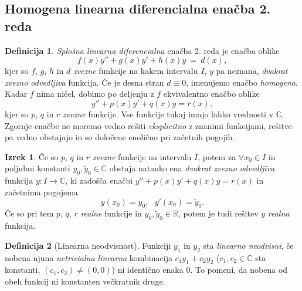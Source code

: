 \documentclass[11pt]{article}
\theoremstyle{definition}
\newtheorem{definicija}{Definicija}[section]
\theoremstyle{definition}
\theoremstyle{definition}
\newtheorem{izrek}{Izrek}[section]
\begin{document}

\subsection{Homogena linearna diferencialna enačba 2. reda}
\vspace{0.5cm}

\begin{definicija}

\textit{Splošna linearna diferencialna} enačba 2. reda je enačba oblike
$$f(x) y'' + g(x) y' + h(x) y ~=~ d(x),$$
kjer so $f$, $g$, $h$ in $d$ \textit{zvezne} funkcije na kakem intervalu $I$, $y$ pa neznana, \textit{dvakrat zvezno odvedljiva} funkcija. Če je desna stran $d \equiv 0$, imenujemo enačbo \textit{homogena}. Kadar $f$ nima ničel, dobimo po deljenju z $f$ ekvivalentno enačbo oblike
$$y'' + p(x) y' + q(x) y = r(x),$$
kjer so $p$, $q$ in $r$ \textit{zvezne} funkcije. Vse funkcije tukaj imajo lahko vrednosti v $\mathbb{C}$. Zgornje enačbe ne moremo vedno rešiti \textit{eksplicitno} z znanimi funkcijami, rešitve pa vedno obstajajo in so določene enolično pri začetnih pogojih.

\end{definicija}
\vspace{0.5cm}

\begin{izrek}

Če so $p$, $q$ in $r$ \textit{zvezne} funkcije na intervalu $I$, potem za $\forall x_0 \in I$ in poljubni konstanti $y_0, \tilde{y}_0 \in \mathbb{C}$ obstaja natanko ena \textit{dvakrat zvezno odvedljiva} funkcija $y: I \rightarrow \mathbb{C}$, ki zadošča enačbi $y'' + p(x) y' + q(x) y = r(x)$ in začetnima pogojema 
$$y(x_0) = y_0, ~~~y'(x_0) = \tilde{y}_0.$$
Če so pri tem $p$, $q$, $r$ \textit{realne} funkcije in $y_0, \tilde{y}_0 \in \mathbb{R}$, potem je tudi rešitev $y$ \textit{realna} funkcija.

\end{izrek}
\vspace{0.5cm}

\begin{definicija}[Linearna neodvisnost]

Funkciji $y_1$ in $y_2$ sta \textit{linearno neodvisni}, če nobena njuna \textit{netrivialna linearna} kombinacija $c_1 y_1 + c_2 y_2$ ($c_1, c_2 \in \mathbb{C}$ sta konstanti, $(c_1, c_2) \neq (0,0)$) ni identično enaka $0$. To pomeni, da nobena od obeh funkcij ni konstanten večkratnik druge.

\end{definicija}
\vspace{0.5cm}
\end{document}
